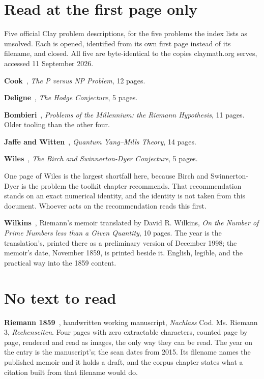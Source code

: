 \section{Read at the first page only}

Five official Clay problem descriptions, for the five problems the index lists as unsolved. Each is
opened, identified from its own first page instead of its filename, and closed. All five are
byte-identical to the copies claymath.org serves, accessed 11 September 2026.

\textbf{Cook}~\cite{src:Cook}, \emph{The P versus NP Problem}, 12 pages.

\textbf{Deligne}~\cite{src:Deligne}, \emph{The Hodge Conjecture}, 5 pages.

\textbf{Bombieri}~\cite{src:Bombieri}, \emph{Problems of the Millennium: the Riemann Hypothesis}, 11
pages. Older tooling than the other four.

\textbf{Jaffe and Witten}~\cite{src:Jaffe-and-Witten}, \emph{Quantum Yang--Mills Theory}, 14 pages.

\textbf{Wiles}~\cite{src:Wiles}, \emph{The Birch and Swinnerton-Dyer Conjecture}, 5 pages.

One page of Wiles is the largest shortfall here, because Birch and Swinnerton-Dyer is the
problem the toolkit chapter recommends. That recommendation stands on an exact numerical identity,
and the identity is not taken from this document. Whoever acts on the recommendation reads this
first.

\textbf{Wilkins}~\cite{src:Wilkins-1998}, Riemann's memoir translated by David R. Wilkins, \emph{On
the Number of Prime Numbers less than a Given Quantity}, 10 pages. The year is the translation's,
printed there as a preliminary version of December 1998; the memoir's date, November 1859, is
printed beside it. English, legible, and the practical way into the 1859 content.

\section{No text to read}

\textbf{Riemann 1859}~\cite{src:Riemann-1859}, handwritten working manuscript, \emph{Nachlass} Cod.
Ms. Riemann 3, \emph{Rechenseiten}. Four pages with zero extractable characters, counted page by
page, rendered and read as images, the only way they can be read. The year on the entry is the
manuscript's; the scan dates from 2015. Its filename names the published memoir and it holds a
draft, and the corpus chapter states what a citation built from that filename would do.

